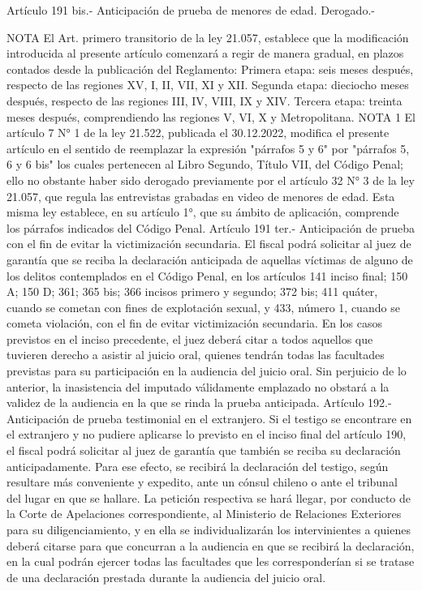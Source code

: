     Artículo 191 bis.- Anticipación de prueba de menores de edad. Derogado.-




NOTA
      El Art. primero transitorio de la ley 21.057, establece que la modificación introducida al presente artículo comenzará a regir de manera gradual, en plazos contados desde la publicación del Reglamento: Primera etapa: seis meses después, respecto de las regiones XV, I, II, VII, XI y XII.  Segunda etapa: dieciocho meses después, respecto de las regiones III, IV, VIII, IX y XIV.  Tercera etapa:  treinta meses después, comprendiendo las regiones V, VI, X y Metropolitana.
NOTA 1
      El artículo 7 N° 1 de la ley 21.522, publicada el 30.12.2022, modifica el presente artículo en el sentido de reemplazar la expresión "párrafos 5 y 6" por "párrafos 5, 6 y 6 bis" los cuales pertenecen al Libro Segundo, Título VII, del Código Penal; ello no obstante haber sido derogado previamente por el artículo 32 N° 3 de la ley 21.057, que regula las entrevistas grabadas en video de menores de edad. Esta misma ley establece, en su artículo 1°, que su ámbito de aplicación, comprende los párrafos indicados del Código Penal.
    Artículo 191 ter.- Anticipación de prueba con el fin de evitar la victimización secundaria. El fiscal podrá solicitar al juez de garantía que se reciba la declaración anticipada de aquellas víctimas de alguno de los delitos contemplados en el Código Penal, en los artículos 141 inciso final; 150 A; 150 D; 361; 365 bis; 366 incisos primero y segundo; 372 bis; 411 quáter, cuando se cometan con fines de explotación sexual, y 433, número 1, cuando se cometa violación, con el fin de evitar victimización secundaria.     
    En los casos previstos en el inciso precedente, el juez deberá citar a todos aquellos que tuvieren derecho a asistir al juicio oral, quienes tendrán todas las facultades previstas para su participación en la audiencia del juicio oral.
    Sin perjuicio de lo anterior, la inasistencia del imputado válidamente emplazado no obstará a la validez de la audiencia en la que se rinda la prueba anticipada.
    Artículo 192.- Anticipación de prueba testimonial en el extranjero. Si el testigo se encontrare en el extranjero y no pudiere aplicarse lo previsto en el inciso final del artículo 190, el fiscal podrá solicitar al juez de garantía que también se reciba su declaración anticipadamente.
    Para ese efecto, se recibirá la declaración del testigo, según resultare más conveniente y expedito, ante un cónsul chileno o ante el tribunal del lugar en que se hallare.
    La petición respectiva se hará llegar, por conducto de la Corte de Apelaciones correspondiente, al Ministerio de Relaciones Exteriores para su diligenciamiento, y en ella se individualizarán los intervinientes a quienes deberá citarse para que concurran a la audiencia en que se recibirá la declaración, en la cual podrán ejercer todas las facultades que les corresponderían si se tratase de una declaración prestada durante la audiencia del juicio oral.
